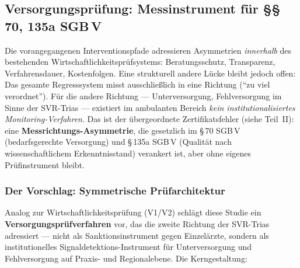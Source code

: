 \documentclass{umbruch-position}
\begin{document}
\subsection{Versorgungsprüfung: Messinstrument für \S\S\,70, 135a SGB\,V}
\label{subsec:versorgungspruefung}

Die vorangegangenen Interventionspfade adressieren Asymmetrien \textit{innerhalb} des bestehenden Wirtschaftlichkeits\-prüfsystems: Beratungsschutz, Transparenz, Verfahrensdauer, Kostenfolgen. Eine strukturell andere Lücke bleibt jedoch offen: Das gesamte Regresssystem misst ausschließlich in eine Richtung (``zu viel verordnet''). Für die andere Richtung --- Unterversorgung, Fehlversorgung im Sinne der SVR-Trias --- existiert im ambulanten Bereich \textit{kein institutionalisiertes Monitoring-Verfahren}. Das ist der übergeordnete Zertifikatsfehler (siehe Teil~II): eine \textbf{Messrichtungs-Asymmetrie}, die gesetzlich im \S\,70 SGB\,V (bedarfsgerechte Versorgung) und \S\,135a SGB\,V (Qualität nach wissenschaftlichem Erkenntnisstand) verankert ist, aber ohne eigenes Prüfinstrument bleibt.

\subsubsection{Der Vorschlag: Symmetrische Prüfarchitektur}

Analog zur Wirtschaftlichkeitsprüfung (V1/V2) schlägt diese Studie ein \textbf{Versorgungsprüfverfahren} vor, das die zweite Richtung der SVR-Trias adressiert --- nicht als Sanktionsinstrument gegen Einzelärzte, sondern als institutionelles Signaldetektions-Instrument für Unterversorgung und Fehlversorgung auf Praxis- und Regionalebene. Die Kerngestaltung:
\end{document}
